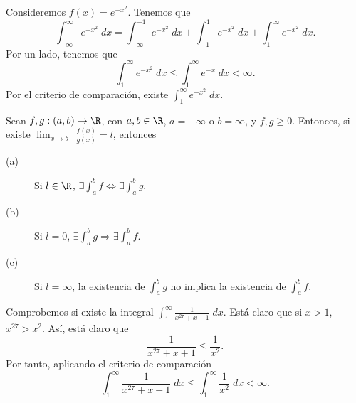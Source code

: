 \begin{eg}
\normalfont Consideremos $\displaystyle f\left(x\right) = e^{-x^{2}} $. Tenemos que
\[ \int^{\infty}_{-\infty} e^{-x^{2}} \; dx =  \int^{-1}_{-\infty} e^{-x^{2}} \; dx + \int^{1}_{-1} e^{-x^{2}} \; dx  + \int^{\infty}_{1} e^{-x^{2}} \; dx .\]
Por un lado, tenemos que 
\[ \int^{\infty}_{1} e^{-x^{2}} \; dx \leq \int^{\infty}_{1} e^{-x} \; dx < \infty .\]
Por el criterio de comparación, existe $\displaystyle \int^{\infty}_{1} e^{-x^{2}} \; dx $.
\end{eg}
\begin{ftheorem}
\normalfont Sean $\displaystyle f,g : (a,b) \to \R $, con $\displaystyle a,b \in \R $, $\displaystyle a = - \infty $ o $\displaystyle b = \infty $, y $\displaystyle f,g \geq 0 $. Entonces, si existe $\displaystyle \lim_{x \to b^{-}}\frac{f\left(x\right)}{g\left(x\right)} = l $, entonces
\begin{description}
\item[(a)] Si $\displaystyle l \in \R $, $\displaystyle \exists \int^{b}_{a} f \iff \exists \int^{b}_{a} g $. 
\item[(b)] Si $\displaystyle l = 0 $, $\displaystyle \exists \int^{b}_{a} g \Rightarrow \exists \int^{b}_{a} f  $. 
\item[(c)] Si $\displaystyle l = \infty $, la existencia de $\displaystyle \int^{b}_{a} g $ no implica la existencia de $\displaystyle \int^{b}_{a} f $.
\end{description}
\end{ftheorem}
\begin{eg}
\normalfont Comprobemos si existe la integral $\displaystyle \int^{\infty}_{1} \frac{1}{x^{27}+x+1} \; dx $. Está claro que si $\displaystyle x > 1 $, $\displaystyle x^{27} > x^{2} $. Así, está claro que
\[ \frac{1}{x^{27}+x+1} \leq \frac{1}{x^{2}} .\]
Por tanto, aplicando el criterio de comparación
\[ \int^{\infty}_{1} \frac{1}{x^{27}+x+1} \; dx \leq \int^{\infty}_{1} \frac{1}{x^{2}} \; dx < \infty .\]
\end{eg}

